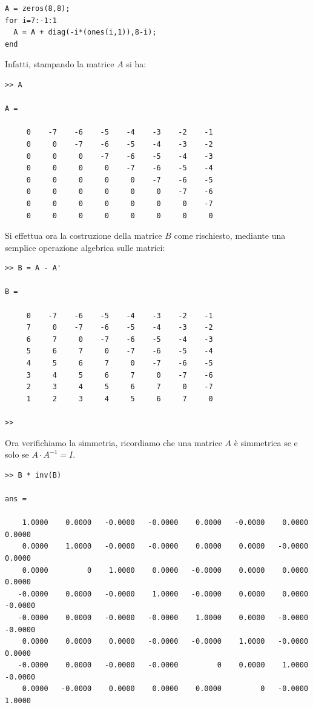 \begin{enumerate}
\begin{svol}
\begin{itemize}
\begin{codice}
\begin{verbatim}
A = zeros(8,8);
for i=7:-1:1
  A = A + diag(-i*(ones(i,1)),8-i);
end
\end{verbatim}
\end{codice}
Infatti, stampando la matrice $A$ si ha:
\begin{codice}
\begin{verbatim}
>> A

A =

     0    -7    -6    -5    -4    -3    -2    -1
     0     0    -7    -6    -5    -4    -3    -2
     0     0     0    -7    -6    -5    -4    -3
     0     0     0     0    -7    -6    -5    -4
     0     0     0     0     0    -7    -6    -5
     0     0     0     0     0     0    -7    -6
     0     0     0     0     0     0     0    -7
     0     0     0     0     0     0     0     0

\end{verbatim}
\end{codice}
Si effettua ora la costruzione della matrice $B$ come rischiesto, mediante
una semplice operazione algebrica sulle matrici:
\begin{codice}
\begin{verbatim}
>> B = A - A'

B =

     0    -7    -6    -5    -4    -3    -2    -1
     7     0    -7    -6    -5    -4    -3    -2
     6     7     0    -7    -6    -5    -4    -3
     5     6     7     0    -7    -6    -5    -4
     4     5     6     7     0    -7    -6    -5
     3     4     5     6     7     0    -7    -6
     2     3     4     5     6     7     0    -7
     1     2     3     4     5     6     7     0

>> 
\end{verbatim}
\end{codice}
Ora verifichiamo la simmetria, ricordiamo che una matrice $A$ è simmetrica
se e solo se $A \cdot A^{-1} = I$.
\begin{codice}
\begin{verbatim}
>> B * inv(B)

ans =

    1.0000    0.0000   -0.0000   -0.0000    0.0000   -0.0000    0.0000    0.0000
    0.0000    1.0000   -0.0000   -0.0000    0.0000    0.0000   -0.0000    0.0000
    0.0000         0    1.0000    0.0000   -0.0000    0.0000    0.0000    0.0000
   -0.0000    0.0000   -0.0000    1.0000   -0.0000    0.0000    0.0000   -0.0000
   -0.0000    0.0000   -0.0000   -0.0000    1.0000    0.0000   -0.0000   -0.0000
    0.0000    0.0000    0.0000   -0.0000   -0.0000    1.0000   -0.0000    0.0000
   -0.0000    0.0000   -0.0000   -0.0000         0    0.0000    1.0000   -0.0000
    0.0000   -0.0000    0.0000    0.0000    0.0000         0   -0.0000    1.0000


\end{verbatim}
\end{codice}
\end{itemize}
\end{svol}
\end{enumerate}
